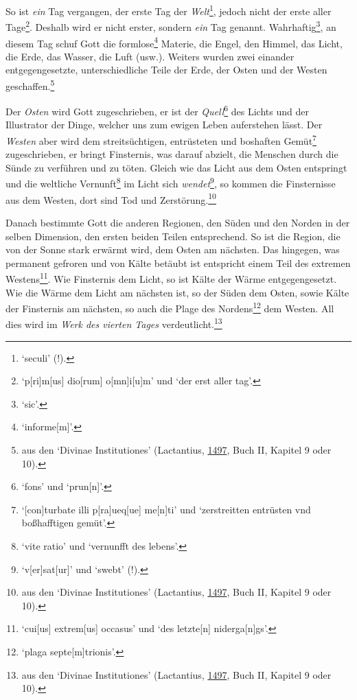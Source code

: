 \documentclass[
]{article}
\begin{document}
So ist \emph{ein} Tag vergangen, der erste Tag der
\emph{Welt}\footnote{`seculi' (!).}, jedoch nicht der erste aller
Tage\footnote{`p{[}ri{]}m{[}us{]} dio{[}rum{]} o{[}mn{]}i{[}u{]}m' und
  `der erst aller tag'.}. Deshalb wird er nicht erster, sondern
\emph{ein} Tag genannt. Wahrhaftig\footnote{`sic'.}, an diesem Tag schuf
Gott die formlose\footnote{`informe{[}m{]}'.} Materie, die Engel, den
Himmel, das Licht, die Erde, das Wasser, die Luft (usw.). Weiters wurden
zwei einander entgegengesetzte, unterschiedliche Teile der Erde, der
Osten und der Westen geschaffen.\footnote{aus den `Divinae
  Institutiones' (Lactantius,
  \href{https://books.google.com/books?id=qGsnghsi3uUC}{1497}, Buch II,
  Kapitel 9 oder 10).}

Der \emph{Osten} wird Gott zugeschrieben, er ist der
\emph{Quell}\footnote{`fons' und `prun{[}n{]}'.} des Lichts und der
Illustrator der Dinge, welcher uns zum ewigen Leben auferstehen lässt.
Der \emph{Westen} aber wird dem streitsüchtigen, entrüsteten und
boshaften Gemüt\footnote{`{[}con{]}turbate illi p{[}ra{]}ueq{[}ue{]}
  me{[}n{]}ti' und `zerstreitten entrüsten vnd boßhafftigen gemüt'.}
zugeschrieben, er bringt Finsternis, was darauf abzielt, die Menschen
durch die Sünde zu verführen und zu töten. Gleich wie das Licht aus dem
Osten entspringt und die weltliche Vernunft\footnote{`vite ratio' und
  `vernunfft des lebens'.} im Licht sich \emph{wendet}\footnote{`v{[}er{]}sat{[}ur{]}'
  und `swebt' (!).}, so kommen die Finsternisse aus dem Westen, dort
sind Tod und Zerstörung.\footnote{aus den `Divinae Institutiones'
  (Lactantius,
  \href{https://books.google.com/books?id=qGsnghsi3uUC}{1497}, Buch II,
  Kapitel 9 oder 10).}

Danach bestimmte Gott die anderen Regionen, den Süden und den Norden in
der selben Dimension, den ersten beiden Teilen entsprechend. So ist die
Region, die von der Sonne stark erwärmt wird, dem Osten am nächsten. Das
hingegen, was permanent gefroren und von Kälte betäubt ist entspricht
einem Teil des extremen Westens\footnote{`cui{[}us{]} extrem{[}us{]}
  occasus' und `des letzte{[}n{]} niderga{[}n{]}gs'.}. Wie Finsternis
dem Licht, so ist Kälte der Wärme entgegengesetzt. Wie die Wärme dem
Licht am nächsten ist, so der Süden dem Osten, sowie Kälte der
Finsternis am nächsten, so auch die Plage des Nordens\footnote{`plaga
  septe{[}m{]}trionis'.} dem Westen. All dies wird im \emph{Werk des
vierten Tages} verdeutlicht.\footnote{aus den `Divinae Institutiones'
  (Lactantius,
  \href{https://books.google.com/books?id=qGsnghsi3uUC}{1497}, Buch II,
  Kapitel 9 oder 10).}
\end{document}
